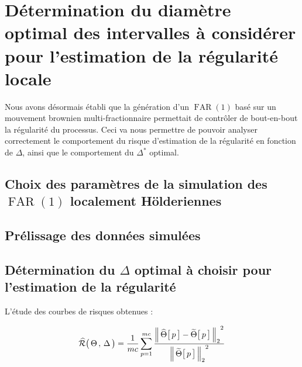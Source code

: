 \chapter{Détermination du diamètre optimal des intervalles à considérer pour l'estimation de la régularité locale }
\minitoc%


Nous avons désormais établi que la génération d'un $\operatorname{FAR}(1)$ basé sur un mouvement brownien multi-fractionnaire permettait de contrôler de bout-en-bout la régularité du processus. Ceci va nous permettre de pouvoir analyser correctement le comportement du risque d'estimation de la régularité en fonction de $\Delta$, ainsi que le comportement du $\Delta^*$ optimal.

\section{Choix des paramètres de la simulation des $\operatorname{FAR}(1)$ localement Hölderiennes}



\section{Prélissage des données simulées}




% 
% 
% 
\section{Détermination du $\Delta$ optimal à choisir pour l'estimation de la régularité}
\label{sec:determination-delta}

\noindent L'étude des courbes de risques obtenues :

\begin{equation}
\widehat{\mathcal R} \bigl( \, \Theta \, , \, \Delta \, \bigr) 
= 
\frac 1 {mc} \sum\limits_{p=1}^{mc} \frac{{\distnorme 2 {\widehat \Theta\bigl[\, p \,\bigr]} {\widetilde \Theta \bigl[ \,p \,\bigr]}}^2}{{\norme 2 {\widetilde \Theta \bigl[ \,p \,\bigr]}}^2}
\end{equation}

